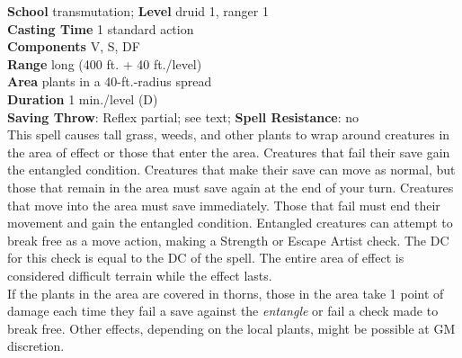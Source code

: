 \textbf{School }transmutation; \textbf{Level }druid 1, ranger 1\\
\textbf{Casting Time }1 standard action\\
\textbf{Components }V, S, DF\\
\textbf{Range }long (400 ft. + 40 ft./level)\\
\textbf{Area }plants in a 40-ft.-radius spread\\
\textbf{Duration }1 min./level (D)\\
\textbf{Saving Throw}: Reflex partial; see text; \textbf{Spell Resistance}: no\\
This spell causes tall grass, weeds, and other plants to wrap around creatures in the area of effect or those that enter the area. Creatures that fail their save gain the entangled condition. Creatures that make their save can move as normal, but those that remain in the area must save again at the end of your turn. Creatures that move into the area must save immediately. Those that fail must end their movement and gain the entangled condition. Entangled creatures can attempt to break free as a move action, making a Strength or Escape Artist check. The DC for this check is equal to the DC of the spell. The entire area of effect is considered difficult terrain while the effect lasts.\\
If the plants in the area are covered in thorns, those in the area take 1 point of damage each time they fail a save against the \textit{entangle} or fail a check made to break free. Other effects, depending on the local plants, might be possible at GM discretion.\\
